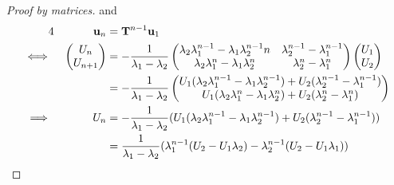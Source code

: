 \begin{proof}[Proof by matrices]
 and
 \begin{alignat*}4
  &&\vec u_n &= \mat T^{n - 1} \vec u_1 \\
  \iff{}&&
   \begin{pmatrix}
    U_n \\
    U_{n + 1}
   \end{pmatrix} &=
   -\frac 1{\lambda_1 - \lambda_2}
   \begin{pmatrix}
    \lambda_2 \lambda_1^{n - 1} -\lambda_1 \lambda_2^{n - 1}n
     & \lambda_2^{n - 1} - \lambda_1^{n - 1} \\
    \lambda_2 \lambda_1^n - \lambda_1 \lambda_2^n & \lambda_2^n - \lambda_1^n
   \end{pmatrix}
   \begin{pmatrix}
    U_1 \\
    U_2
   \end{pmatrix} \\
  && &=
  -\frac 1{\lambda_1 - \lambda_2}
   \begin{pmatrix}
    U_1(\lambda_2 \lambda_1^{n - 1} - \lambda_1 \lambda_2^{n - 1})
  + U_2(\lambda_2^{n - 1} - \lambda_1^{n - 1}) \\
    U_1(\lambda_2 \lambda_1^n - \lambda_1 \lambda_2^n)
  + U_2(\lambda_2^n - \lambda_1^n) \\
   \end{pmatrix} \\
   \implies{}&& U_n &=
    -\frac 1{\lambda_1 - \lambda_2} (
       U_1(\lambda_2 \lambda_1^{n - 1} - \lambda_1 \lambda_2^{n - 1})
     + U_2(\lambda_2^{n - 1} - \lambda_1^{n - 1})) \\
   && &= 
    \frac 1{\lambda_1 - \lambda_2} (
       \lambda_1^{n - 1} (U_2 - U_1 \lambda_2)
     - \lambda_2^{n - 1} (U_2 - U_1 \lambda_1)) \qedhere
 \end{alignat*}
\end{proof}

